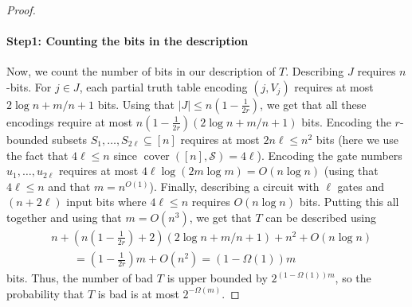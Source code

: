 \begin{proof}
\paragraph{Step1: Counting the bits in the description}
Now, we count the number of bits in our description of $T$. Describing $J$ requires $n$-bits. For $j\in J$, each partial truth table encoding $(j,V_j)$ requires at most $2\log n+m/n+1$ bits. Using that $|J|\leq n(1-\frac1{2r})$, we get that all these encodings require at most $n(1-\frac1{2r})(2\log n+m/n+1)$ bits. Encoding the $r$-bounded subsets $S_1,\ldots,S_{2\ell}\subseteq[n]$ requires at most $2n\ell\leq n^2$ bits (here we use the fact that $4\ell\leq n$ since $\operatorname{cover}([n],\mathcal S)=4\ell$). Encoding the gate numbers $u_1,\ldots,u_{2\ell}$ requires at most $4\ell\log(2m\log m)=O(n\log n)$ (using that $4\ell\leq n$ and that $m=n^{O(1)}$). Finally, describing a circuit with $\ell$ gates and $(n+2\ell)$ input bits where $4\ell\leq n$ requires $O(n\log n)$ bits. Putting this all together and using that $m=O(n^3)$, we get that $T$ can be described using
\begin{align*}&n+(n(1-\tfrac1{2r})+2)(2\log n+m/n+1)+n^2+O(n\log n)\\&\qquad=(1-\tfrac1{2r})m+O(n^2)=(1-\Omega(1))m\end{align*}
bits. Thus, the number of bad $T$ is upper bounded by $2^{(1-\Omega(1))m}$, so the probability that $T$ is bad is at most $2^{-\Omega(m)}$.
\end{proof}
